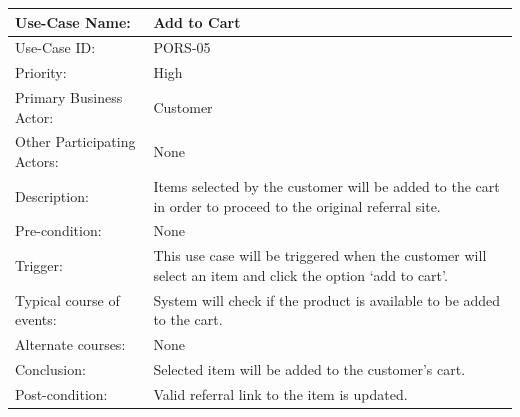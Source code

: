\begin{center}
    \begin{tabular}{ @{}|p{7cm}||p{7cm}|  }
    \hline
    Use-Case Name: & Add to Cart  \\ \hline
    Use-Case ID: & PORS-05 \\ \hline
    Priority: & High \\ \hline
    Primary Business Actor: & Customer \\ \hline
    Other Participating Actors: & None \\ \hline
    Description: & Items selected by the customer will be added to the cart in order to proceed to the original referral site. \\ \hline
    Pre-condition: & None \\ \hline
    Trigger: & This use case will be triggered when the customer will select an item and click the option ‘add to cart’. \\ \hline
    Typical course of events: & System will check if the product is available to be added to the cart. \\ \hline
    Alternate courses: & None \\ \hline
    Conclusion: &  Selected item will be added to the customer’s cart.\\ \hline
    Post-condition: &  Valid referral link to the item is updated. \\ \hline
    \end{tabular}
\end{center}


